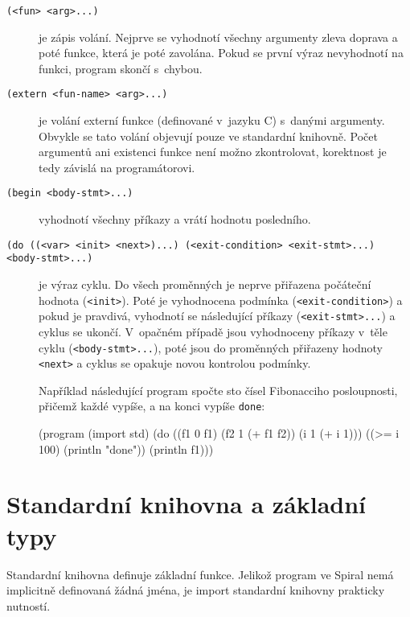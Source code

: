 \begin{description}
  \item[\texttt{(<fun> <arg>...)}] je zápis volání. Nejprve se vyhodnotí všechny
    argumenty zleva doprava a poté funkce, která je poté zavolána. Pokud se
    první výraz nevyhodnotí na funkci, program skončí s~chybou.

  \item[\texttt{(extern <fun-name> <arg>...)}] je volání externí funkce
    (definované v~jazyku C) s~danými argumenty. Obvykle se tato volání objevují
    pouze ve standardní knihovně. Počet argumentů ani existenci funkce není
    možno zkontrolovat, korektnost je tedy závislá na programátorovi.

  \item[\texttt{(begin <body-stmt>...)}] vyhodnotí všechny příkazy a vrátí
    hodnotu posledního.

  \item[\texttt{(do ((<var> <init> <next>)...) (<exit-condition> <exit-stmt>...)
    <body-stmt>...)}] je výraz cyklu. Do všech proměnných je neprve přiřazena
    počáteční hodnota (\texttt{<init>}). Poté je vyhodnocena podmínka
    (\texttt{<exit-condition>}) a pokud je pravdivá, vyhodnotí se následující
    příkazy (\texttt{<exit-stmt>...}) a cyklus se ukončí. V~opačném případě jsou
    vyhodnoceny příkazy v~těle cyklu (\texttt{<body-stmt>...}), poté jsou do
    proměnných přiřazeny hodnoty \texttt{<next>} a cyklus se opakuje novou
    kontrolou podmínky.

    Například následující program spočte sto čísel Fibonacciho posloupnosti,
    přičemž každé vypíše, a na konci vypíše \texttt{done}:

\begin{spiral}
(program
  (import std)
  (do ((f1 0 f1)
       (f2 1 (+ f1 f2))
       (i  1 (+ i 1)))
    ((>= i 100)
      (println "done"))
    (println f1)))
\end{spiral}
\end{description}

\section{Standardní knihovna a základní typy}

Standardní knihovna definuje základní funkce. Jelikož program ve Spiral nemá
implicitně definovaná žádná jména, je import standardní knihovny prakticky
nutností.


